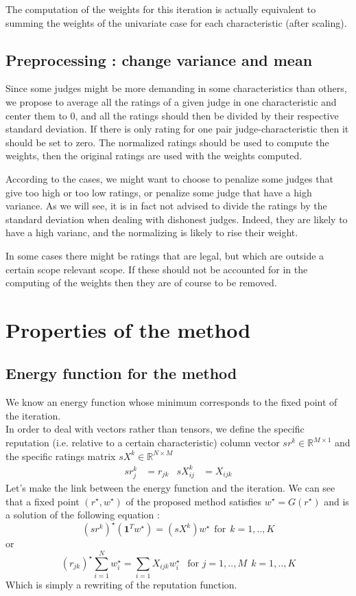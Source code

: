 \documentclass[12pt,a4paper]{article}
\begin{document}
The computation of the weights for this iteration is actually equivalent to summing the weights of the univariate case for each characteristic (after scaling).


\subsection{Preprocessing : change variance and mean}
Since some judges might be more demanding in some characteristics than others, we propose to average all the ratings of a given judge in one characteristic and center them to $0$, and all the ratings should then be divided by their respective standard deviation. If there is only rating for one pair judge-characteristic then it should be set to zero. The normalized ratings should be used to compute the weights, then the original ratings are used with the weights computed.

According to the cases, we might want to choose to penalize some judges that give too high or too low ratings, or penalize some judge that have a high variance. As we will see, it is in fact not advised to divide the ratings by the standard deviation when dealing with dishonest judges. Indeed, they are likely to have a high varianc, and the normalizing is likely to rise their weight.

In some cases there might be ratings that are legal, but which are outside a certain scope relevant scope. If these should not be accounted for in the computing of the weights then they are of course to be removed.


\section{Properties of the method}
\subsection{Energy function for the method}
We know an energy function whose minimum corresponds to the fixed point of the iteration.\\
In order to deal with vectors rather than tensors, we define the specific reputation (i.e. relative to a certain characteristic) column vector $ sr^k \in \mathbb{R}^{M\times 1}$ and the specific ratings matrix $sX^k \in \mathbb{R}^{N\times M}$
\begin{align*}
sr^k_{j} &= r_{jk} & sX^k_{ij} &= X_{ijk}
\end{align*}
Let's make the link between the energy function and the iteration. 
We can see that a fixed point $(r^{\star},w^{\star})$ of the proposed method satisfies $ w^{\star} = G(r^{\star})$ and is a solution of the following equation :
$$ (sr^k)^{\star} (\mathbf{1}^Tw^{\star}) = (sX^k)w^{\star} \:\:\text{for} \:\: k = 1,..,K$$
or 
$$ (r_{jk})^{\star} \sum_{i=1}^N w_i^{\star} = \sum_{i=1} X_{ijk} w_i^{\star} \:\:\text{ for } j = 1,..,M \:\: k = 1,..,K$$
Which is simply a rewriting of the reputation function.
\end{document}
